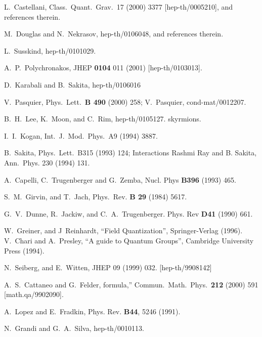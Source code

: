 \documentclass[a4paper,12pt]{article}
\begin{document}
\newpage
\begin{thebibliography}{bib}
  
L.~Castellani, Class.~Quant.~Grav.~17 (2000)
3377
  [hep-th/0005210], and references therein.
  
M.~Douglas and N.~Nekrasov, hep-th/0106048, and
references
  therein.
  
L.~Susskind, hep-th/0101029.
  
A.~P.~Polychronakos, JHEP {\bf 0104} 011 (2001)
  [hep-th/0103013].
  
D.~Karabali and B.~Sakita, hep-th/0106016
  
V.~Pasquier, Phys.~Lett.~{\bf B 490} (2000) 258;
  V.~Pasquier, cond-mat/0012207.
  
B.~H.~Lee, K.~Moon, and C.~Rim, hep-th/0105127.
skyrmions.
  
I.~I.~Kogan, Int.~J.~Mod.~Phys.~A9 (1994) 3887.
  
B.~Sakita, Phys.~Lett.~B315 (1993) 124;
Interactions 
  Rashmi Ray and B. Sakita, Ann.~Phys. 230 (1994) 131.
  
A.~Capelli, C.~Trugenberger and G.~Zemba, Nucl. Phys
{\bf
    B396} (1993) 465.
  
S.~M.~Girvin, and T.~Jach, Phys.~Rev. {\bf B 29} (1984)
  5617.
  
G.~V.~Dunne, R.~Jackiw, and C.~A.~Trugenberger.
Phys.
  Rev {\bf D41} (1990) 661.
  
W.~Greiner, and J~Reinhardt, ``Field
Quantization'',
  Springer-Verlag (1996).   V.~Chari and A.~Presley,
``A
  guide to Quantum Groups'', Cambridge University Press (1994).
  
N.~Seiberg, and E.~Witten, JHEP 09 (1999) 032.
  [hep-th/9908142]
     
A.~S.~Cattaneo and G.~Felder,
formula,''
  Commun.\ Math.\ Phys.\ {\bf 212} (2000) 591 [math.qa/9902090].
  
A.~Lopez and E.~Fradkin, Phys. Rev. {\bf B44}, 5246
  (1991).
  
N.~Grandi and G.~A.~Silva, hep-th/0010113.
  

\end{thebibliography}
\end{document}
